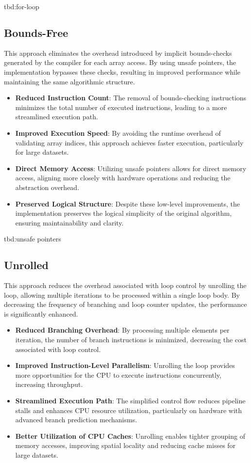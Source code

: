 \documentclass{article}
\begin{document}
tbd:for-loop

\subsection{Bounds-Free}

This approach eliminates the overhead introduced by implicit bounds-checks generated by the compiler for each array access. By using unsafe pointers, the implementation bypasses these checks, resulting in improved performance while maintaining the same algorithmic structure.

\begin{itemize}
  \item \textbf{Reduced Instruction Count}: The removal of bounds-checking instructions minimizes the total number of executed instructions, leading to a more streamlined execution path.
  \item \textbf{Improved Execution Speed}: By avoiding the runtime overhead of validating array indices, this approach achieves faster execution, particularly for large datasets.
  \item \textbf{Direct Memory Access}: Utilizing unsafe pointers allows for direct memory access, aligning more closely with hardware operations and reducing the abstraction overhead.
  \item \textbf{Preserved Logical Structure}: Despite these low-level improvements, the implementation preserves the logical simplicity of the original algorithm, ensuring maintainability and clarity.
\end{itemize}

tbd:unsafe pointers

\subsection{Unrolled}

This approach reduces the overhead associated with loop control by unrolling the loop, allowing multiple iterations to be processed within a single loop body. By decreasing the frequency of branching and loop counter updates, the performance is significantly enhanced.

\begin{itemize}
  \item \textbf{Reduced Branching Overhead}: By processing multiple elements per iteration, the number of branch instructions is minimized, decreasing the cost associated with loop control.
  \item \textbf{Improved Instruction-Level Parallelism}: Unrolling the loop provides more opportunities for the CPU to execute instructions concurrently, increasing throughput.
  \item \textbf{Streamlined Execution Path}: The simplified control flow reduces pipeline stalls and enhances CPU resource utilization, particularly on hardware with advanced branch prediction mechanisms.
  \item \textbf{Better Utilization of CPU Caches}: Unrolling enables tighter grouping of memory accesses, improving spatial locality and reducing cache misses for large datasets.
\end{itemize}
\end{document}
